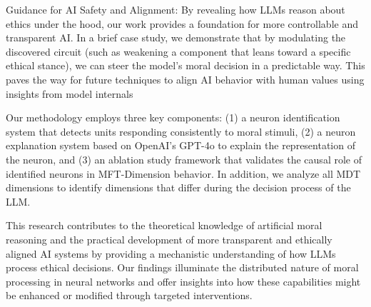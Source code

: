 Guidance for AI Safety and Alignment: By revealing how LLMs reason about ethics under the hood, our work provides a foundation for more controllable and transparent AI. In a brief case study, we demonstrate that by modulating the discovered circuit (such as weakening a component that leans toward a specific ethical stance), we can steer the model’s moral decision in a predictable way. This paves the way for future techniques to align AI behavior with human values using insights from model internals​







 Our methodology employs three key components: (1) a neuron identification system that detects units responding consistently to moral stimuli, (2) a neuron explanation system based on OpenAI's GPT-4o to explain the representation of the neuron, and (3) an ablation study framework that validates the causal role of identified neurons in MFT-Dimension behavior. In addition, we analyze all MDT dimensions to identify dimensions that differ during the decision process of the LLM.



This research contributes to the theoretical knowledge of artificial moral reasoning and the practical development of more transparent and ethically aligned AI systems by providing a mechanistic understanding of how LLMs process ethical decisions. Our findings illuminate the distributed nature of moral processing in neural networks and offer insights into how these capabilities might be enhanced or modified through targeted interventions.











